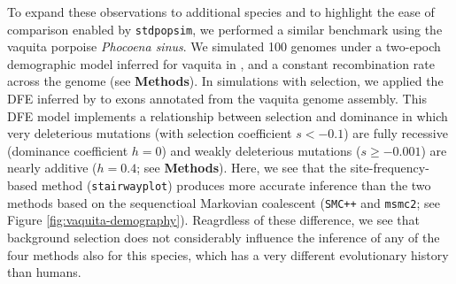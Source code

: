 \documentclass[hidelinks]{article}
\newcommand{\stdpopsim}{\texttt{stdpopsim}\xspace}
\newcommand{\msmc}{\texttt{msmc2}\xspace}
\newcommand{\stairway}{\texttt{stairwayplot}\xspace}
\newcommand{\gone}{\texttt{GONE}\xspace}
\newcommand{\smcpp}{\texttt{SMC++}\xspace}
\begin{document}
    To expand these observations to additional species and to highlight the ease of comparison enabled by \stdpopsim,
    we performed a similar benchmark using the vaquita porpoise \textit{Phocoena sinus}.
    We simulated 100 genomes under a two-epoch demographic model inferred for vaquita in \textcite{robinson2022critically},
    and a constant recombination rate across the genome (see \textbf{Methods}).
    In simulations with selection, we applied the DFE inferred by \textcite{robinson2022critically} to exons
    annotated from the vaquita genome assembly.
    This DFE model implements a relationship between selection and dominance 
    in which very deleterious mutations (with selection coefficient $s<-0.1$) are fully recessive
    (dominance coefficient $h=0$) and weakly deleterious mutations ($s\geq -0.001$) are nearly
    additive ($h=0.4$; see \textbf{Methods}).
    Here, we see that the site-frequency-based method (\stairway) produces more accurate
    inference than the two methods based on the sequenctioal Markovian coalescent (\smcpp and \msmc; see Figure \ref{fig:vaquita-demography}).
    Reagrdless of these difference, we see that background selection does not
    considerably influence the inference of any of the four methods also for this species,
    which has a very different evolutionary history than humans.
    
    


%
\end{document}
